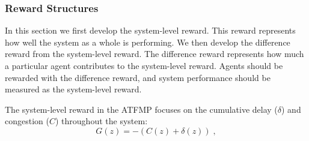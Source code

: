 \documentclass[letterpaper]{article}
\begin{document}

 

\subsubsection{Reward Structures}

In this section we first develop the system-level reward. This reward represents how well the system as a whole is performing. We then develop the difference reward from the system-level reward. The difference reward represents how much a particular agent contributes to the system-level reward. Agents should be rewarded with the difference reward, and system performance should be measured as the system-level reward. 

The system-level reward in the ATFMP focuses on the cumulative delay ($\delta$) and congestion ($C$) throughout the system:
%
\begin{equation} \label{eq:Global}
G(z) = -(C(z) + \delta(z))\;,
\end{equation}
%
%
%
\end{document}
